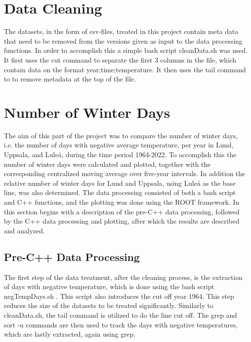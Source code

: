 \documentclass[aps,prl,groupedaddress,twocolumn]{revtex4-1}
\begin{document}
\section{Data Cleaning}

The datasets, in the form of csv-files, treated in this project contain meta data that need to be removed from the versions given as input to the data processing functions. In order to accomplish this a simple bash script cleanData.sh was used. It first uses the cut command to separate the first 3 columns in the file, which contain data on the format year;time;temperature. It then uses the tail command to to remove metadata at the top of the file.
\vspace{-0.6cm}
\section{Number of Winter Days}

The aim of this part of the project was to compare the number of winter days, i.e. the number of days with negative average temperature, per year in Lund, Uppsala, and Luleå, during the time period 1964-2022. To accomplish this the number of winter days were calculated and plotted, together with the corresponding centralized moving average over five-year intervals. In addition the relative number of winter days for Lund and Uppsala, using Luleå as the base line, was also determined. The data processing consisted of both a bash script and C++ functions, and the plotting was done using the ROOT framework. In this section begins with a description of the pre-C++ data processing, followed by the C++ data processing and plotting, after which the results are described and analyzed.  
\vspace{-0.5cm}

\subsection{Pre-C++ Data Processing}

The first step of the data treatment, after the cleaning process, is the extraction of days with negative temperature, which is done using the bash script negTempDays.sh . This script also introduces the cut off year 1964. This step reduces the size of the datasets to be treated significantly. Similarly to cleanData.sh, the tail command is utilized to do the line cut off. The grep and sort -u commands are then used to track the days with negative temperatures, which are lastly extracted, again using grep.
\vspace{-0.5cm}
\end{document}
